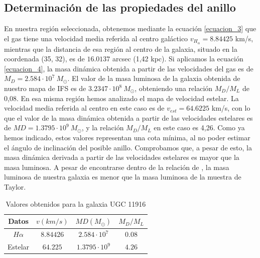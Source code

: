 \documentclass{article}
\begin{document}
\subsection{Determinación de las propiedades del anillo}
En nuestra región seleccionada, obtenemos mediante la ecuación \ref{ecuacion_3} que el gas tiene una velocidad media referida al centro galáctico $v_{H_{\alpha}} = 8.84425$ km/s, mientras que la distancia de esa región al centro de la galaxia, situado en la coordenada (35, 32), es de $16.0137$ arcsec (1,42 kpc). Si aplicamos la ecuación \ref{ecuacion_4}, la masa dinámica obtenida a partir de las velocidades del gas es de $M_{D} = 2.584\cdot 10^{7}\ M_{\odot}$. El valor de la masa luminosa de la galaxia obtenida de nuestro mapa de IFS es de $3.2347\cdot 10^{8}\ M_{\odot}$, obteniendo una relación $M_{D} / M_{L}$ de 0,08.
En esa misma región hemos analizado el mapa de velocidad estelar. La velocidad media referida al centro en este caso es de $v_{est} = 64.6225$ km/s, con lo que el valor de la masa dinámica obtenida a partir de las velocidades estelares es de $MD = 1.3795\cdot 10^{9}\ M_{\odot}$, y la relación $M_{D} / M_{L}$ en este caso es 4,26. Como ya hemos indicado, estos valores representan una cota mínima, al no poder estimar el ángulo de inclinación del posible anillo. Comprobamos que, a pesar de esto, la masa dinámica derivada a partir de las velocidades estelares es mayor que la masa luminosa. A pesar de encontrarse dentro de la relación de \cite{Taylor2010}, la masa luminosa de nuestra galaxia es menor que la masa luminosa de la muestra de Taylor.
\begin{table}[H]
\centering
\begin{tabular}{cccc} \toprule
Datos & $v(km/s)$ & $MD(M_{\odot})$ & $M_{D} / M_{L}$\\ \midrule
$H\alpha$ & $8.84426$ & $2.584\cdot 10^{7}$ & $0.08$\\
Estelar & $64.225$ & $1.3795\cdot 10^{9}$ & $4.26$\\ \bottomrule
\end{tabular}
\caption{Valores obtenidos para la galaxia UGC 11916}
\label{Tabla_1}
\end{table}
\end{document}
